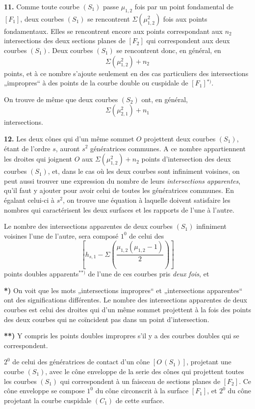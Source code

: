 \documentclass{article}
\begin{document}
\textbf{11.} Comme toute courbe $(S_1)$ passe $\mu_{1, 2}$ fois par un point fondamental de $[F_1]$, deux courbes $(S_1)$ se rencontrent $\Sigma(\mu_{1, 2}^2)$ fois aux points fondamentaux. Elles se rencontrent encore aux points correspondant aux $n_2$ intersections des deux sections planes de $[F_2]$ qui correspondent aux deux courbes $(S_1)$. Deux courbes $(S_1)$ se rencontrent donc, en général, en
\[
\Sigma(\mu_{1, 2}^2) + n_2
\]
points, et à ce nombre s'ajoute seulement en des cas particuliers des intersections „impropres“ à des points de la courbe double ou cuspidale de $[F_1]$${}^{*)}$.

On trouve de même que deux courbes $(S_2)$ ont, en général,
\[
\Sigma(\mu_{2, 1}^2) + n_1
\]
intersections.

\textbf{12.} Les deux cônes qui d'un même sommet $O$ projettent deux courbes $(S_1)$, étant de l'ordre $s$, auront $s^2$ génératrices communes. A ce nombre appartiennent les droites qui joignent $O$ aux $\Sigma(\mu_{1, 2}^2) + n_2$ points d'intersection des deux courbes $(S_1)$, et, dans le cas où les deux courbes sont infiniment voisines, on peut aussi trouver une expression du nombre de leurs \emph{intersections apparentes}, qu'il faut y ajouter pour avoir celui de toutes les génératrices communes. En égalant celui-ci à $s^2$, on trouve une équation à laquelle doivent satisfaire les nombres qui caractérisent les deux surfaces et les rapports de l'une à l'autre.

Le nombre des intersections apparentes de deux courbes $(S_1)$ infiniment voisines l'une de l'autre, sera composé $1^0$ de celui des
\[
\left[ h_{s, 1} - \Sigma\left( \frac{\mu_{1, 2}(\mu_{1, 2} - 1)}{2} \right) \right]
\]
points doubles apparents${}^{**)}$ de l'une de ces courbes pris \emph{deux fois}, et

\textbf{*)} On voit que les mots „intersections impropres“ et „intersections apparentes“ ont des significations différentes. Le nombre des intersections apparentes de deux courbes est celui des droites qui d'un même sommet projettent à la fois des points des deux courbes qui ne coïncident pas dans un point d'intersection.

\textbf{**)} Y compris les points doubles impropres s'il y a des courbes doubles qui se correspondent.

$2^0$ de celui des génératrices de contact d'un cône $[O\,(S_1)]$, projetant une courbe $(S_1)$, avec le cône enveloppe de la serie des cônes qui projettent toutes les courbes $(S_1)$ qui correspondent à un faisceau de sections planes de $[F_2]$. Ce cône enveloppe se compose $1^0$ du cône circonscrit à la surface $[F_1]$, et $2^0$ du cône projetant la courbe cuspidale $(C_1)$ de cette surface.
\end{document}
